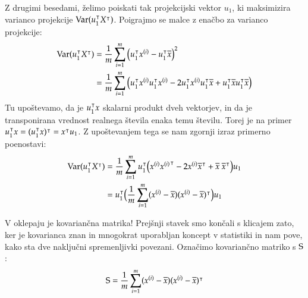 Z drugimi besedami, želimo poiskati tak projekcijski vektor $u_1$, ki maksimizira varianco projekcije $\mathrm{Var}(u_1^\intercal X^\intercal)$. Poigrajmo se malce z enačbo za varianco projekcije:
%
\begin{equation}
  \begin{split}
    \mathrm{Var}(u_1^\intercal X^\intercal)
    & = \frac{1}{m}\sum_{i=1}^m \big(u_1^\intercal x^{(i)}-u_1^\intercal\overline{x}\big)^2 \\
    & = \frac{1}{m}\sum_{i=1}^m \big(u_1^\intercal x^{(i)} u_1^\intercal x^{(i)} - 2 u_1^\intercal x^{(i)} u_1^\intercal \overline{x} + u_1^\intercal \overline{x} u_1^\intercal \overline{x} \big)
  \end{split}
\end{equation}
%
Tu upoštevamo, da je $u_1^\intercal x$ skalarni produkt dveh vektorjev, in da je transponirana vrednost realnega števila enaka temu številu. Torej je na primer $u_1^\intercal x=(u_1^\intercal x)^\intercal=x^\intercal u_1$. Z upoštevanjem tega se nam zgornji izraz primerno poenostavi:
%
\begin{equation}
  \begin{split}
    \mathrm{Var}(u_1^\intercal X^\intercal)
    & = \frac{1}{m}\sum_{i=1}^m u_1^\intercal \big(x^{(i)} {x^{(i)}}^\intercal - 2 x^{(i)} \overline{x}^\intercal + \overline{x}~\overline{x}^\intercal \big) u_1 \\
    & = u_1^\intercal \big( \frac{1}{m}\sum_{i=1}^m (x^{(i)}-\overline{x}) (x^{(i)}-\overline{x})^\intercal\big) u_1
  \end{split}
\end{equation}

V oklepaju je kovariančna matrika! Prejšnji stavek smo končali s klicajem zato, ker je kovarianca znan in mnogokrat uporabljan koncept v statistiki in nam pove, kako sta dve naključni spremenljivki povezani. Označimo kovariančno matriko s ${\rm S}$:
\begin{equation}
  {\rm S} = \frac{1}{m}\sum_{i=1}^m (x^{(i)}-\overline{x}) (x^{(i)}-\overline{x})^\intercal
\end{equation}

